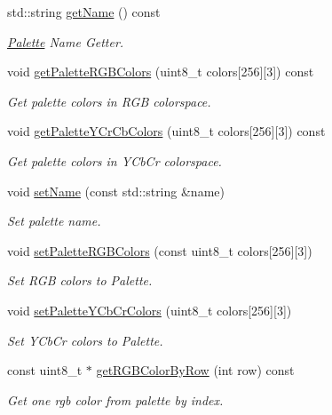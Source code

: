 \begin{DoxyCompactItemize}
std\+::string \hyperlink{classwtl_1_1_palette_aba4a2d20fa181f012751e03d3270ee9d}{get\+Name} () const
\begin{DoxyCompactList}\small\item\em \hyperlink{classwtl_1_1_palette}{Palette} Name Getter. \end{DoxyCompactList}\item 
void \hyperlink{classwtl_1_1_palette_af3031f114fdff5c9fa8b9f84152472e3}{get\+Palette\+R\+G\+B\+Colors} (uint8\+\_\+t colors\mbox{[}256\mbox{]}\mbox{[}3\mbox{]}) const
\begin{DoxyCompactList}\small\item\em Get palette colors in R\+GB colorspace. \end{DoxyCompactList}\item 
void \hyperlink{classwtl_1_1_palette_a0a6e936380bbaed21b3bfbaf1a92637c}{get\+Palette\+Y\+Cr\+Cb\+Colors} (uint8\+\_\+t colors\mbox{[}256\mbox{]}\mbox{[}3\mbox{]}) const
\begin{DoxyCompactList}\small\item\em Get palette colors in Y\+Cb\+Cr colorspace. \end{DoxyCompactList}\item 
void \hyperlink{classwtl_1_1_palette_a50c0f821a8365ad59974841a6a9030e4}{set\+Name} (const std\+::string \&name)
\begin{DoxyCompactList}\small\item\em Set palette name. \end{DoxyCompactList}\item 
void \hyperlink{classwtl_1_1_palette_a249fabbd46ae920339334610da724690}{set\+Palette\+R\+G\+B\+Colors} (const uint8\+\_\+t colors\mbox{[}256\mbox{]}\mbox{[}3\mbox{]})
\begin{DoxyCompactList}\small\item\em Set R\+GB colors to Palette. \end{DoxyCompactList}\item 
void \hyperlink{classwtl_1_1_palette_aac6a445b9edc9a80d1433cffc299ad4c}{set\+Palette\+Y\+Cb\+Cr\+Colors} (uint8\+\_\+t colors\mbox{[}256\mbox{]}\mbox{[}3\mbox{]})
\begin{DoxyCompactList}\small\item\em Set Y\+Cb\+Cr colors to Palette. \end{DoxyCompactList}\item 
const uint8\+\_\+t $\ast$ \hyperlink{classwtl_1_1_palette_a02df9e7df1e4e4507053939ae4e6f900}{get\+R\+G\+B\+Color\+By\+Row} (int row) const
\begin{DoxyCompactList}\small\item\em Get one rgb color from palette by index. \end{DoxyCompactList}\end{DoxyCompactItemize}


